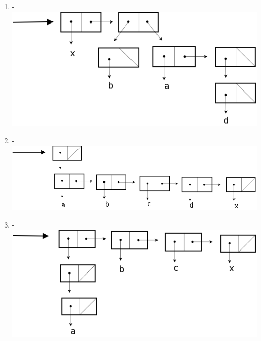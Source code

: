 \documentclass[a4paper, 11pt]{article}
\begin{document}
\begin{enumerate}
    \item -\\ \includegraphics[scale=0.3]{reponse4.png}
    \item -\\ \includegraphics[scale=0.3]{reponse5.png}
    \item -\\ \includegraphics[scale=0.3]{reponse6.png}
\end{enumerate}

%
\end{document}
